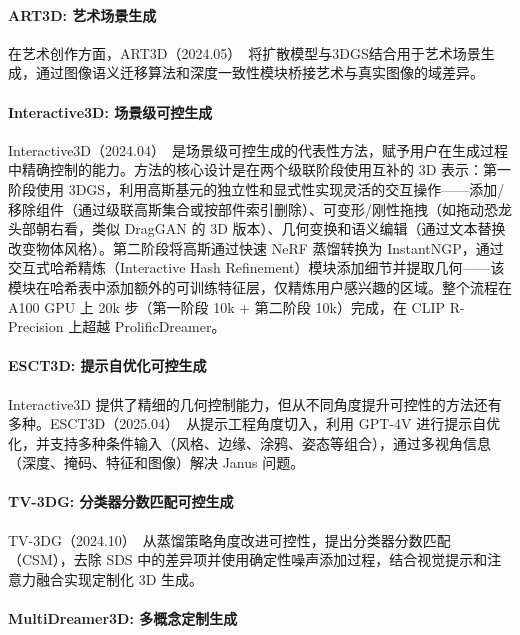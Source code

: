 \paragraph{ART3D: 艺术场景生成}

在艺术创作方面，ART3D（2024.05）~\cite{2405_10508}将扩散模型与3DGS结合用于艺术场景生成，通过图像语义迁移算法和深度一致性模块桥接艺术与真实图像的域差异。

\paragraph{Interactive3D: 场景级可控生成}

Interactive3D（2024.04）~\cite{2404_16510}是场景级可控生成的代表性方法，赋予用户在生成过程中精确控制的能力。方法的核心设计是在两个级联阶段使用互补的 3D 表示：第一阶段使用 3DGS，利用高斯基元的独立性和显式性实现灵活的交互操作——添加/移除组件（通过级联高斯集合或按部件索引删除）、可变形/刚性拖拽（如拖动恐龙头部朝右看，类似 DragGAN 的 3D 版本）、几何变换和语义编辑（通过文本替换改变物体风格）。第二阶段将高斯通过快速 NeRF 蒸馏转换为 InstantNGP，通过交互式哈希精炼（Interactive Hash Refinement）模块添加细节并提取几何——该模块在哈希表中添加额外的可训练特征层，仅精炼用户感兴趣的区域。整个流程在 A100 GPU 上 20k 步（第一阶段 10k + 第二阶段 10k）完成，在 CLIP R-Precision 上超越 ProlificDreamer。

\paragraph{ESCT3D: 提示自优化可控生成}

Interactive3D 提供了精细的几何控制能力，但从不同角度提升可控性的方法还有多种。ESCT3D（2025.04）~\cite{2504_10316}从提示工程角度切入，利用 GPT-4V 进行提示自优化，并支持多种条件输入（风格、边缘、涂鸦、姿态等组合），通过多视角信息（深度、掩码、特征和图像）解决 Janus 问题。

\paragraph{TV-3DG: 分类器分数匹配可控生成}

TV-3DG（2024.10）~\cite{2410_21299}从蒸馏策略角度改进可控性，提出分类器分数匹配（CSM），去除 SDS 中的差异项并使用确定性噪声添加过程，结合视觉提示和注意力融合实现定制化 3D 生成。

\paragraph{MultiDreamer3D: 多概念定制生成}


